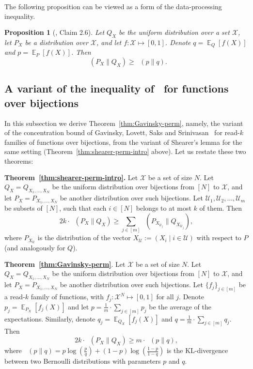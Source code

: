 \documentclass[11pt]{article}
\newtheorem{proposition}[theorem]{Proposition}
\DeclareMathOperator*{\E}{\mathbb{E}}
\DeclareMathOperator{\KL}{D_{\text{KL}}}
\newcommand{\Qcal}{\mathcal{U}}
\begin{document}
The following proposition can be viewed as a form of the data-processing inequality.

\begin{proposition}[\cite{GavinskyLSS15}, Claim 2.6] \label{prop:dpKL}
Let $Q_X$ be the uniform distribution over a set $\mathcal{X}$, let $P_X$ be a distribution over $\mathcal{X}$, and let $f:\mathcal{X} \mapsto [0,1]$. 
Denote $q = \E_{Q}[f(X)]$ and $p = \E_{P}[f(X)]$.
Then
$$\KL( P_X \| Q_X ) \geq \KL(p \| q ).$$
\end{proposition}

\subsection{A variant of the inequality of~\cite{GavinskyLSS15} for functions over bijections}

In this subsection we derive Theorem~\ref{thm:Gavinsky-perm}, namely, the variant of the concentration bound of Gavinsky, Lovett, Saks and Srinivasan~\cite{GavinskyLSS15} for read-$k$ families of functions over bijections, from the variant of Shearer's lemma for the same setting (Theorem~\ref{thm:shearer-perm-intro} above). Let us restate these two theorems:

\medskip \noindent \textbf{Theorem~\ref{thm:shearer-perm-intro}.} Let $\mathcal{X}$ be a set of size $N$. Let $Q_X = Q_{X_1,\ldots,X_N}$ be the uniform distribution over bijections from $[N]$ to $\mathcal{X}$,
and let $P_X = P_{X_1,\ldots,X_N}$ be another distribution over such bijections. Let 
$\Qcal_1,\Qcal_2,\ldots,\Qcal_m$ be subsets of $[N]$, such that each $i \in [N]$ belongs to at most $k$ of them. Then
$$
2k \cdot  \KL( P_X \| Q_X ) \geq \sum_{j \in [m]} \KL( P_{X_{\mathcal{U}_j}} \| Q_{X_{\mathcal{U}_j}} ),$$
where $P_{X_{\mathcal{U}}}$ is the distribution of the vector $X_{\mathcal{U}} := \left(X_i \mid i \in \mathcal{U} \right)$ with respect to $P$ (and analogously for $Q$).

\medskip \noindent \textbf{Theorem~\ref{thm:Gavinsky-perm}}.
Let $\mathcal{X}$ be a set of size $N$. Let $Q_X = Q_{X_1,\ldots,X_N}$ be the uniform distribution over bijections from $[N]$ to $\mathcal{X}$,
and let $P_X = P_{X_1,\ldots,X_N}$ be another distribution over such bijections. 
Let $\{ f_j \}_{j \in [m]}$ be a read-$k$ family of functions, with $f_j:\mathcal{X}^N \mapsto [0,1]$ for all $j$. Denote $p_j = \E_{P_X}[f_j(X)]$ and let $p = \frac{1}{m} \cdot \sum_{j \in [m]} p_j$ be the average of the expectations. Similarly, denote $q_j = \E_{Q_X}[f_j(X)]$ and $q = \frac{1}{m} \cdot \sum_{j \in [m]} q_j$.
Then
$$2k \cdot  \KL( P_X \| Q_X ) \geq m \cdot \KL( p \| q ),$$
where $\KL( p \| q ) = p \log(\frac{p}{q}) + (1-p)\log(\frac{1-p}{1-q})$ is the KL-divergence between two Bernoulli distributions with parameters $p$ and $q$.
\end{document}
